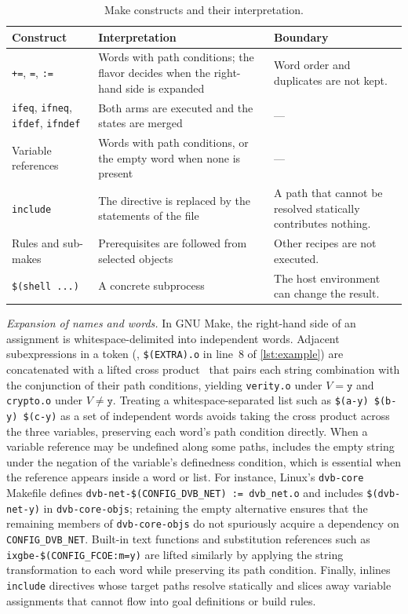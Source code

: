 \documentclass[acmsmall,screen,review,anonymous,nonacm]{acmart}
\begin{document}
  \begin{table}[t]
  \centering\footnotesize
  \caption{Make constructs and their interpretation.}
  \label{tab:scope}
  \begin{tabular}{p{26mm}p{45mm}p{50mm}}
  \toprule
  Construct & Interpretation & Boundary \\
  \midrule
  \texttt{+=}, \texttt{=}, \texttt{:=} & Words with path conditions; the flavor decides when the right-hand side is expanded & Word order and duplicates are not kept. \\
  \texttt{ifeq}, \texttt{ifneq}, \texttt{ifdef}, \texttt{ifndef} & Both arms are executed and the states are merged & --- \\
  Variable references & Words with path conditions, or the empty word when none is present & --- \\
  \texttt{include} & The directive is replaced by the statements of the file & A path that cannot be resolved statically contributes nothing. \\
  Rules and sub-makes & Prerequisites are followed from selected objects & Other recipes are not executed. \\
  \texttt{\$(shell ...)} & A concrete subprocess & The host environment can change the result. \\
  \bottomrule
  \end{tabular}
  \end{table}

  \emph{Expansion of names and words.}
  In GNU Make, the right-hand side of an assignment is whitespace-delimited into independent words.
  Adjacent subexpressions in a token (\eg, \texttt{\$(EXTRA).o} in line~8 of \autoref{lst:example}) are concatenated with a lifted cross product~\cite{gazzillo2017kmax} that pairs each string combination with the conjunction of their path conditions, yielding \texttt{verity.o} under $V = \mathtt{y}$ and \texttt{crypto.o} under $V \ne \mathtt{y}$.
  Treating a whitespace-separated list such as \texttt{\$(a-y) \$(b-y) \$(c-y)} as a set of independent words avoids taking the cross product across the three variables, preserving each word's path condition directly.
  When a variable reference may be undefined along some paths, \tool{} includes the empty string under the negation of the variable's definedness condition, which is essential when the reference appears inside a word or list.
  For instance, Linux's \texttt{dvb-core} Makefile defines \texttt{dvb-net-\$(CONFIG\_DVB\_NET) := dvb\_net.o} and includes \texttt{\$(dvb-net-y)} in \texttt{dvb-core-objs}; retaining the empty alternative ensures that the remaining members of \texttt{dvb-core-objs} do not spuriously acquire a dependency on \texttt{CONFIG\_DVB\_NET}.
  Built-in text functions and substitution references such as \texttt{ixgbe-\$(CONFIG\_FCOE:m=y)} are lifted similarly by applying the string transformation to each word while preserving its path condition.
  Finally, \tool{} inlines \texttt{include} directives whose target paths resolve statically and slices away variable assignments that cannot flow into goal definitions or build rules.
\end{document}
